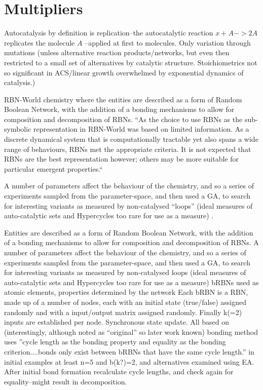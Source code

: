 \section{Multipliers}
\begin{NOTES}
Autocatalysis by definition is replication--the autocatalytic reaction $x+A->2A$ replicates the molecule $A$ \cite{Lifson1997}--applied at first to molecules. Only variation through mutations (unless alternative reaction products/networks, but even then restricted to a small set of alternatives by catalytic structure. Stoichiometrics not so significant in ACS/linear growth overwhelmed by exponential dynamics of catalysis.)


RBN-World \cite{Faulconbridge2011} chemistry where the entities are described as a form of Random Boolean Network, with the addition of a bonding mechanisms to allow for composition and decomposition of RBNs. ``As the choice to use RBNs as the sub-symbolic representation in RBN-World was based on limited information. As a discrete dynamical system that is computationally tractable yet also spans a wide range of behaviours, RBNs met the appropriate criteria. It is not expected that RBNs are the best representation however; others may be more suitable for particular emergent properties.``

A number of parameters affect the behaviour of the chemistry, and so a series of experiments sampled from the parameter-space, and then used a GA, to search for interesting variants as measured by non-catalysed ``loops'' (ideal measures of auto-catalytic sets and Hypercycles too rare for use as a measure) \parencite[chap.8]{Faulconbridge2011}. 

Entities are described as a form of Random Boolean Network, with the addition of a bonding mechanisms to allow for composition and decomposition of RBNs. A number of parameters affect the behaviour of the chemistry, and so a series of experiments sampled from the parameter-space, and then used a GA, to search for interesting variants as measured by non-catalysed loops (ideal measures of auto-catalytic sets and Hypercycles too rare for use as a measure) \parencite[chap.8]{Faulconbridge2011}
bRBNs used as atomic elements, properties determined by the network
Each bRBN is a RBN, made up of a number of nodes, each with an initial state (true/false) assigned randomly and with a input/output matrix assigned randomly. Finally k(=2) inputs are established per node. Synchronous state update. All based on \cite{Kauffman:1969ne} (interestingly, although noted as ``original'' so later work known) bonding method uses ''cycle length as the bonding property and equality as the bonding criterion....bonds only exist between bRBNs that have the same cycle length.'' in initial examples at least n=5 and b(k?)=2, and alternatives examined using EA. After initial bond formation recalculate cycle lengths, and check again for equality--might result in decomposition.


\end{NOTES}
